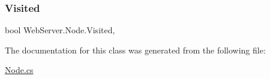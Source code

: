 \mbox{\label{class_web_server_1_1_node_a09aaee2c59baa9487e330466ab4ff145}} 
\subsubsection{\texorpdfstring{Visited}{Visited}}
{\footnotesize\ttfamily bool Web\+Server.\+Node.\+Visited\hspace{0.3cm}{\ttfamily [get]}, {\ttfamily [set]}}







The documentation for this class was generated from the following file\+:\begin{DoxyCompactItemize}
\item 
\hyperlink{_node_8cs}{Node.\+cs}\end{DoxyCompactItemize}
